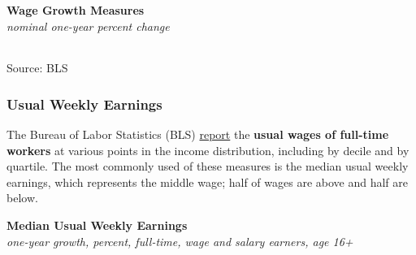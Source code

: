\documentclass{report}
\makeatletter
\newcommand{\tbllink}[1]{\href{https://raw.githubusercontent.com/bdecon/US-chartbook/master/chartbook/data/#1}{\faTable}}
\newcommand*\short[1]{\expandafter\@gobbletwo\number\numexpr#1\relax}
\newcommand{\dateaxisticks}{
		date coordinates in=x, axis line style={draw=none},
		xmax={2023-11-30},
		max space between ticks=40,	    
		xtick={{1990-01-01}, {1992-01-01}, {1994-01-01}, 
			{1996-01-01}, {1998-01-01}, {2000-01-01}, 
			{2002-01-01}, {2004-01-01}, {2006-01-01},
			{2008-01-01}, {2010-01-01}, {2012-01-01}, {2014-01-01},
		    {2016-01-01}, {2018-01-01}, {2020-01-01}, {2022-01-01}, 
		    {2024-01-01}, {2026-01-01}},
		minor xtick={{1989-01-01}, {1991-01-01}, {1993-01-01},
			{1995-01-01}, {1997-01-01}, {1999-01-01}, 
			{2001-01-01}, {2003-01-01}, {2005-01-01}, {2007-01-01},
		    {2009-01-01}, {2011-01-01}, {2013-01-01}, {2015-01-01},
		    {2017-01-01}, {2019-01-01}, {2021-01-01}, {2023-01-01}, 
		    {2025-01-01}, {2027-01-01}},
		enlarge y limits={0.06}, enlarge x limits={0.01},
		xticklabel style={align=center, yshift=-2pt}, tick label style={inner sep=0pt},
		}
\newcommand{\bbar}[2]{extra #1 ticks = {{#2}}, extra #1 tick labels = ,
		extra #1 tick style = {grid=major, grid style={thick, black!25}},}
\newcommand{\thinline}[4]{\addplot[no markers, color=#1] 
		table [x=#2, y=#3, col sep=comma] {#4};	}
\newcommand{\thickline}[4]{\addplot[ultra thick, no markers, color=#1] 
		table [x=#2, y=#3, col sep=comma] {#4};	}
\newcommand{\rbars}{
		\fill[color=black!10] (axis cs:{1990-07-01},\pgfkeysvalueof{/pgfplots/ymin}) rectangle 
			(axis cs:{1991-03-01}, \pgfkeysvalueof{/pgfplots/ymax});
		\fill[color=black!10] (axis cs:{2007-12-01},\pgfkeysvalueof{/pgfplots/ymin}) rectangle 
			(axis cs:{2009-07-01}, \pgfkeysvalueof{/pgfplots/ymax});
		\fill[color=black!10] (axis cs:{2001-03-01},\pgfkeysvalueof{/pgfplots/ymin}) rectangle 
			(axis cs:{2001-11-01}, \pgfkeysvalueof{/pgfplots/ymax});
		\fill[color=black!10] (axis cs:{2020-02-01},\pgfkeysvalueof{/pgfplots/ymin}) rectangle 
			(axis cs:{2020-05-01}, \pgfkeysvalueof{/pgfplots/ymax});}
\makeatother
\begin{document}
{\begin{minipage}{0.76\textwidth}
\normalsize \textbf{Wage Growth Measures}\\
\footnotesize{\textit{nominal one-year percent change}}
\vspace*{-8mm}

 \setlength{\tabcolsep}{3.0pt} \color{black!90}
{\renewcommand{\arraystretch}{1.5}
\hspace{-1mm} \begin{tabular}{p{42mm} R{7.2mm} R{7.2mm} R{7.2mm} R{7.2mm} R{7.2mm} 
		R{7.2mm} R{7.2mm} R{7.2mm} }
 \hline
	\end{tabular}}
	\vspace{-2.5mm}
				
\footnotesize{Source: BLS} \hfill  \tbllink{wages_yy_quarterly.csv} 
\vspace{1mm}

\subsubsection*{Usual Weekly Earnings}
\vspace*{-1mm}

\small The Bureau of Labor Statistics (BLS) \href{https://www.bls.gov/webapps/legacy/cpswktab5.htm}{report} the \textbf{usual wages of full-time workers} at various points in the income distribution, including by decile and by quartile. The most commonly used of these measures is the median usual weekly earnings, which represents the middle wage; half of wages are above and half are below.


\vspace{0.5mm}

\normalsize \textbf{Median Usual Weekly Earnings}\\
\footnotesize{\textit{one-year growth, percent, full-time, wage and salary earners, age 16+}}
\vspace{3.6cm}

\hspace{3mm} 


\end{minipage}}
\end{document}
